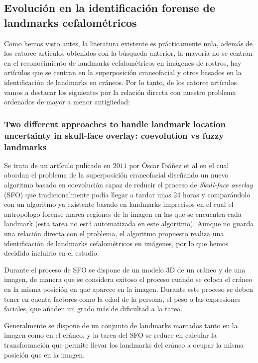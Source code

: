         \subsection{Evolución en la identificación forense de landmarks cefalométricos}
            
            \noindent Como hemos visto antes, la literatura existente es prácticamente nula, además de los catorce artículos obtenidos con la búsqueda anterior, la mayoría no se centran en el reconocimiento de landmarks cefalométricos en imágenes de rostros, hay artículos que se centran en la superposición craneofacial y otros basados en la identificación de landmarks en cráneos. Por lo tanto, de los catorce artículos vamos a destacar los siguientes por la relación directa con nuestro problema ordenados de mayor a menor antigüedad: 

            \subsubsection{Two diﬀerent approaches to handle landmark location uncertainty in skull-face overlay: coevolution vs fuzzy landmarks}
                \noindent Se trata de un artículo pulicado en $2011$ por Óscar Ibáñez et al \cite{ibanez2011two} en el cual abordan el problema de la superposición craneofacial diseñando un nuevo algoritmo basado en coevolución capaz de reducir el proceso de \textit{Skull-face overlay} (SFO) que tradicionalmente podía llegar a tardar unas 24 horas y comparándolo con un algoritmo ya existente basado en landmarks imprecisos en el cual el antropólogo forense marca regiones de la imagen en las que se encuentra cada landmark (esta tarea no está automatizada en este algoritmo). Aunque no guarda una relación directa con el problema, el algoritmo propuesto realiza una identificación de landmarks cefalométricos en imágenes, por lo que hemos decidido incluirlo en el estudio.

                \medskip

                \noindent Durante el proceso de SFO se dispone de un modelo $3$D de un cráneo y de una imagen, de manera que se considera exitoso el proceso cuando se coloca el cráneo en la misma posición en que aparece en la imagen. Durante este proceso se deben tener en cuenta factores como la edad de la persona, el peso o las expresiones faciales, que añaden un grado más de dificultad a la tarea.

                \medskip

                \noindent Generalmente se dispone de un conjunto de landmarks marcados tanto en la imagen como en el cráneo, y la tarea del SFO se reduce en calcular la transformación que permite llevar los landmarks del cráneo a ocupar la misma posición que en la imagen.

